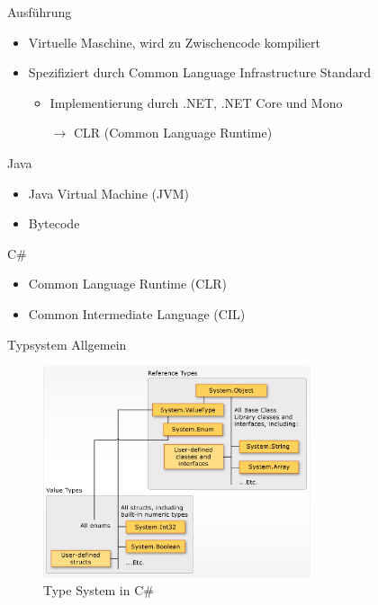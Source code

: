 \documentclass[11pt]{beamer}
\begin{document}
\begin{frame}{Ausführung}

	\begin{itemize}
		\item Virtuelle Maschine, wird zu Zwischencode kompiliert
		\item Spezifiziert durch  Common Language Infrastructure Standard
		\begin{itemize}
			\item Implementierung durch .NET, .NET Core und Mono 
			\item[$\rightarrow$] CLR (Common Language Runtime)
		\end{itemize}
	\end{itemize}
	
	\setlength{\columnseprule}{0.4pt}
	\begin{multicols}{2}
		Java \\
		\begin{itemize}
			\item Java Virtual Machine (JVM)
			\item Bytecode
		\end{itemize}

		\columnbreak

		C\#\\
		\begin{itemize}
			\item Common Language Runtime (CLR)
			\item Common Intermediate Language (CIL)
		\end{itemize}
	\end{multicols}
\end{frame}


\begin{frame}{Typsystem Allgemein}
	\begin{figure}
	\centering
		\includegraphics[width=0.7\textwidth]{bilder/value-reference-types-common-type-system.png}
		\caption{Type System in C\# \cite{progrguide}}
	\end{figure}
\end{frame}
\end{document}
